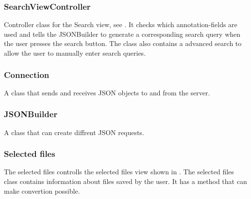 \subsubsection{SearchViewController}
Controller class for the Search view, see . It checks which annotation-fields are used and tells the JSONBuilder to generate a corresponding search query when the user presses the search button. The class also contains a advanced search to allow the user to manually enter search queries. 

\subsubsection{Connection}
A class that sends and receives JSON objects to and from the server.

\subsubsection{JSONBuilder}
A class that can create diffrent JSON requests.

\subsubsection{Selected files}
The selected files controlls the selected files view shown in . The selected files class contains information about files saved by the user. It has a method that can make convertion possible. 
